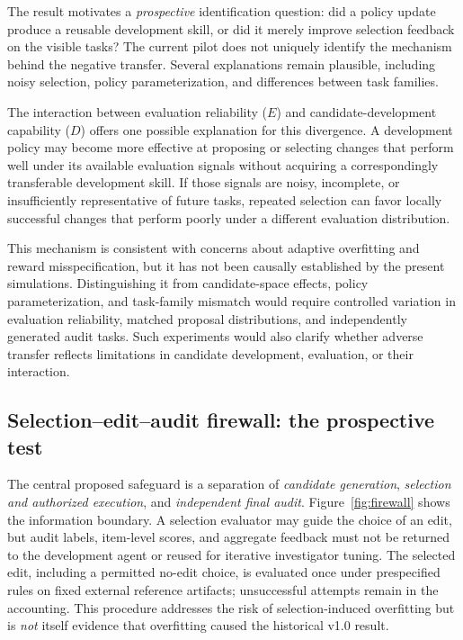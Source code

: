 \documentclass[11pt,a4paper]{article}
\begin{document}
The result motivates a \emph{prospective} identification question: did a policy update produce a reusable development skill, or did it merely improve selection feedback on the visible tasks? The current pilot does not uniquely identify the mechanism behind the negative transfer. Several explanations remain plausible, including noisy selection, policy parameterization, and differences between task families.

The interaction between evaluation reliability ($E$) and candidate-development capability ($D$)
offers one possible explanation for this divergence. A development policy may become more effective at proposing or selecting changes that perform well under its available evaluation signals without acquiring a correspondingly transferable development skill. If those signals are noisy, incomplete, or insufficiently representative of future tasks, repeated selection can favor locally successful changes that perform poorly under a different evaluation distribution.

This mechanism is consistent with concerns about adaptive overfitting and reward misspecification,
but it has not been causally established by the present simulations. Distinguishing it from candidate-space effects, policy parameterization, and task-family mismatch would require controlled variation in evaluation reliability, matched proposal distributions, and independently generated audit tasks. Such experiments would also clarify whether adverse transfer reflects limitations in candidate development, evaluation, or their interaction.

\subsection{Selection--edit--audit firewall: the prospective test}\label{sec:firewall}
The central proposed safeguard is a separation of \emph{candidate generation}, \emph{selection and authorized execution}, and \emph{independent final audit}. Figure~\ref{fig:firewall} shows the information boundary. A selection evaluator may guide the choice of an edit, but audit labels, item-level scores, and aggregate feedback must not be returned to the development agent or reused for iterative investigator tuning. The selected edit, including a permitted no-edit choice, is evaluated once under prespecified rules on fixed external reference artifacts; unsuccessful attempts remain in the accounting. This procedure addresses the risk of selection-induced overfitting but is \emph{not} itself evidence that overfitting caused the historical v1.0 result.
\end{document}

